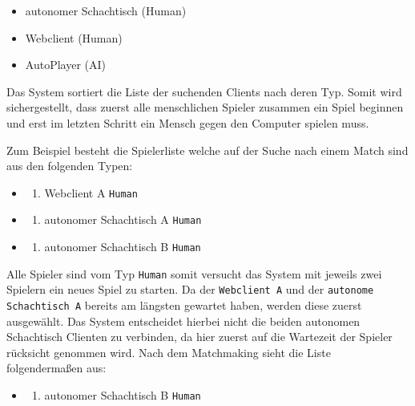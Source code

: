 \begin{itemize}
\tightlist
\item
  autonomer Schachtisch (Human)
\item
  Webclient (Human)
\item
  AutoPlayer (AI)
\end{itemize}

Das System sortiert die Liste der suchenden Clients nach deren Typ.
Somit wird sichergestellt, dass zuerst alle menschlichen Spieler
zusammen ein Spiel beginnen und erst im letzten Schritt ein Mensch gegen
den Computer spielen muss.

Zum Beispiel besteht die Spielerliste welche auf der Suche nach einem
Match sind aus den folgenden Typen:

\begin{itemize}
\item
  \begin{enumerate}
  \def\labelenumi{\arabic{enumi}.}
  \tightlist
  \item
    Webclient A \passthrough{\lstinline!Human!}
  \end{enumerate}
\item
  \begin{enumerate}
  \def\labelenumi{\arabic{enumi}.}
  \setcounter{enumi}{1}
  \tightlist
  \item
    autonomer Schachtisch A \passthrough{\lstinline!Human!}
  \end{enumerate}
\item
  \begin{enumerate}
  \def\labelenumi{\arabic{enumi}.}
  \setcounter{enumi}{2}
  \tightlist
  \item
    autonomer Schachtisch B \passthrough{\lstinline!Human!}
  \end{enumerate}
\end{itemize}

Alle Spieler sind vom Typ \passthrough{\lstinline!Human!} somit versucht
das System mit jeweils zwei Spielern ein neues Spiel zu starten. Da der
\passthrough{\lstinline!Webclient A!} und der
\passthrough{\lstinline!autonome Schachtisch A!} bereits am längsten
gewartet haben, werden diese zuerst ausgewählt. Das System entscheidet
hierbei nicht die beiden autonomen Schachtisch Clienten zu verbinden, da
hier zuerst auf die Wartezeit der Spieler rücksicht genommen wird. Nach
dem Matchmaking sieht die Liste folgendermaßen aus:

\begin{itemize}
\item
  \begin{enumerate}
  \def\labelenumi{\arabic{enumi}.}
  \tightlist
  \item
    autonomer Schachtisch B \passthrough{\lstinline!Human!}
  \end{enumerate}
\end{itemize}

